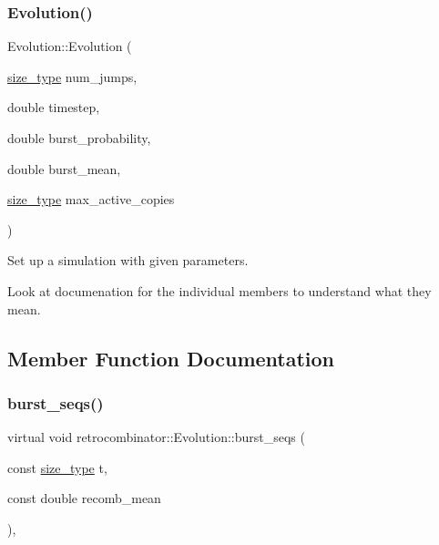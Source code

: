 \subsubsection{\texorpdfstring{Evolution()}{Evolution()}}
{\footnotesize\ttfamily Evolution\+::\+Evolution (\begin{DoxyParamCaption}\item[{\hyperlink{namespaceretrocombinator_a8e1541b50cee66a791df4c437ccbb385}{size\+\_\+type}}]{num\+\_\+jumps,  }\item[{double}]{timestep,  }\item[{double}]{burst\+\_\+probability,  }\item[{double}]{burst\+\_\+mean,  }\item[{\hyperlink{namespaceretrocombinator_a8e1541b50cee66a791df4c437ccbb385}{size\+\_\+type}}]{max\+\_\+active\+\_\+copies }\end{DoxyParamCaption})}



Set up a simulation with given parameters. 

Look at documenation for the individual members to understand what they mean. 

\subsection{Member Function Documentation}
\mbox{\label{classretrocombinator_1_1Evolution_abab94a3f14460300a6a3b7a0286236a6}} 
\subsubsection{\texorpdfstring{burst\+\_\+seqs()}{burst\_seqs()}}
{\footnotesize\ttfamily virtual void retrocombinator\+::\+Evolution\+::burst\+\_\+seqs (\begin{DoxyParamCaption}\item[{const \hyperlink{namespaceretrocombinator_a8e1541b50cee66a791df4c437ccbb385}{size\+\_\+type}}]{t,  }\item[{const double}]{recomb\+\_\+mean }\end{DoxyParamCaption})\hspace{0.3cm}{\ttfamily [protected]}, {}}



